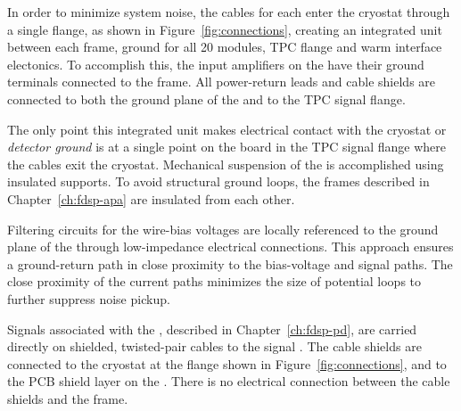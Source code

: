 In order to minimize system noise, the  cables for each  enter 
the cryostat through a single  flange, as shown in Figure~\ref{fig:connections}, creating an integrated 
unit between each  frame,  ground for all \num{20}  modules, TPC flange and warm interface
electonics. To accomplish this,
the input amplifiers on the   have their ground terminals connected to the  frame. 
All power-return leads and cable shields are connected to both the ground plane of the  and to the TPC signal flange.

The only point this integrated unit makes electrical contact with the 
cryostat or \textit{detector ground} is at a single point on the  \fdth board in the TPC signal flange where the 
cables exit the cryostat. Mechanical suspension of the  is accomplished using insulated supports. 
To avoid structural ground loops, the  frames described in Chapter~\ref{ch:fdsp-apa} are 
insulated from each other.

Filtering circuits for the  wire-bias voltages are locally referenced to the ground plane of the  through low-impedance electrical connections. This approach ensures a ground-return path in close proximity to the bias-voltage and signal paths. The close proximity of the current paths minimizes the size of potential loops to further suppress noise pickup.

Signals associated with the , described in Chapter~\ref{ch:fdsp-pd}, are carried directly on shielded, 
twisted-pair cables to the signal \fdth. The cable shields are connected to the cryostat 
at the  flange shown in Figure~\ref{fig:connections}, and to the PCB shield layer on the . There is no electrical connection between the cable shields and the  frame.

